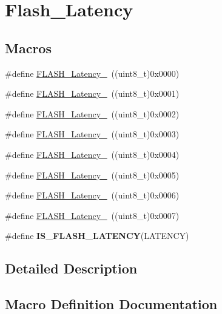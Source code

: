 \hypertarget{group___flash___latency}{}\section{Flash\+\_\+\+Latency}
\label{group___flash___latency}
\subsection*{Macros}
\begin{DoxyCompactItemize}
\item 
\#define \hyperlink{group___flash___latency_ga09afe6e52b819cc074f6111ec42ac3c3}{F\+L\+A\+S\+H\+\_\+\+Latency\+\_}~((uint8\+\_\+t)0x0000)
\item 
\#define \hyperlink{group___flash___latency_ga6b7281665340fe8f7919bdfcfd06f8e6}{F\+L\+A\+S\+H\+\_\+\+Latency\+\_}~((uint8\+\_\+t)0x0001)
\item 
\#define \hyperlink{group___flash___latency_ga55173ebb5c978459ce18d5e2516e3e89}{F\+L\+A\+S\+H\+\_\+\+Latency\+\_}~((uint8\+\_\+t)0x0002)
\item 
\#define \hyperlink{group___flash___latency_ga13fbc5a6423848be5bf631dc437bbc3f}{F\+L\+A\+S\+H\+\_\+\+Latency\+\_}~((uint8\+\_\+t)0x0003)
\item 
\#define \hyperlink{group___flash___latency_ga74a5deaec2020e484ce576925ff7de16}{F\+L\+A\+S\+H\+\_\+\+Latency\+\_}~((uint8\+\_\+t)0x0004)
\item 
\#define \hyperlink{group___flash___latency_ga8e52670ad258b0a95c94b99b8d7eab27}{F\+L\+A\+S\+H\+\_\+\+Latency\+\_}~((uint8\+\_\+t)0x0005)
\item 
\#define \hyperlink{group___flash___latency_ga053dfbef3307536ff40a5ceb2576a4a3}{F\+L\+A\+S\+H\+\_\+\+Latency\+\_}~((uint8\+\_\+t)0x0006)
\item 
\#define \hyperlink{group___flash___latency_ga352a374f6ae41d2cae767ed95efc6ae5}{F\+L\+A\+S\+H\+\_\+\+Latency\+\_}~((uint8\+\_\+t)0x0007)
\item 
\#define {\bfseries I\+S\+\_\+\+F\+L\+A\+S\+H\+\_\+\+L\+A\+T\+E\+N\+C\+Y}(L\+A\+T\+E\+N\+C\+Y)
\end{DoxyCompactItemize}


\subsection{Detailed Description}


\subsection{Macro Definition Documentation}
\hypertarget{group___flash___latency_ga09afe6e52b819cc074f6111ec42ac3c3}{}
